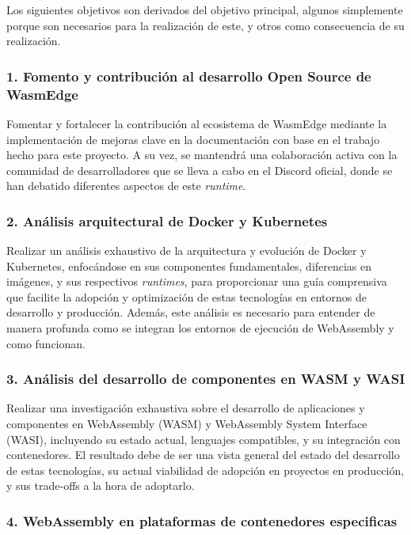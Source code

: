 Los siguientes objetivos son derivados del objetivo principal, algunos simplemente porque son necesarios para la realización de este, y otros como consecuencia de su realización.

\subsubsection{1. Fomento y contribución al desarrollo Open Source de WasmEdge}

Fomentar y fortalecer la contribución al ecosistema de WasmEdge mediante la implementación de mejoras clave en la documentación con base en el trabajo hecho para este proyecto. A su vez, se mantendrá una colaboración activa con la comunidad de desarrolladores que se lleva a cabo en el Discord oficial, donde se han debatido diferentes aspectos de este \textit{runtime}.

\subsubsection{2. Análisis arquitectural de Docker y Kubernetes}

Realizar un análisis exhaustivo de la arquitectura y evolución de Docker y Kubernetes, enfocándose en sus componentes fundamentales, diferencias en imágenes, y sus respectivos \textit{runtimes}, para proporcionar una guía comprensiva que facilite la adopción y optimización de estas tecnologías en entornos de desarrollo y producción. Además, este análisis es necesario para entender de manera profunda como se integran los entornos de ejecución de WebAssembly y como funcionan.

\subsubsection{3. Análisis del desarrollo de componentes en WASM y WASI}

Realizar una investigación exhaustiva sobre el desarrollo de aplicaciones y componentes en WebAssembly (WASM) y WebAssembly System Interface (WASI), incluyendo su estado actual, lenguajes compatibles, y su integración con contenedores. El resultado debe de ser una vista general del estado del desarrollo de estas tecnologías, su actual viabilidad de adopción en proyectos en producción, y sus trade-offs a la hora de adoptarlo.

\subsubsection{4. WebAssembly en plataformas de contenedores especificas}

